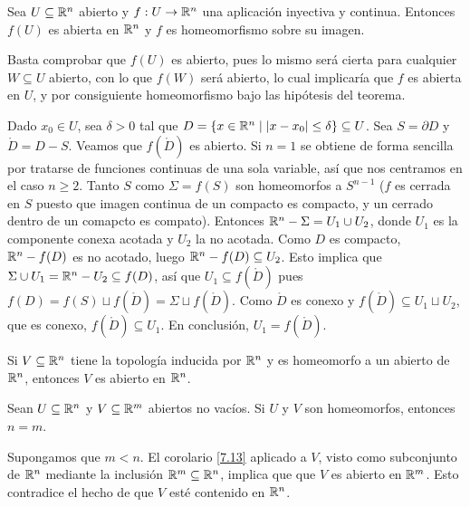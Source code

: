 \documentclass[CV.tex]{subfiles}
\begin{document}
\begin{teorema}[de Brouwer] 
Sea $U\subseteq\mathbb{R}^n$ abierto y $f:U\to\mathbb{R}^n$ una aplicación inyectiva y continua. Entonces $f(U)$ es abierta en $\mathbb{R}^n$ y $f$ es homeomorfismo sobre su imagen. 
\end{teorema}
\begin{dem}
Basta comprobar que $f(U)$ es abierto, pues lo mismo será cierta para cualquier $W\subseteq U$ abierto, con lo que $f(W)$ será abierto, lo cual implicaría que $f$ es abierta en $U$, y por consiguiente homeomorfismo bajo las hipótesis del teorema. 

Dado $x_0\in U$, sea $\delta>0$ tal que $D=\{x\in\mathbb{R}^n\mid |x-x_0|\leq\delta\}\subseteq U$. Sea $S=\partial D$ y $\mathring{D}=D-S$. Veamos que $f(\mathring{D})$ es abierto. Si $n=1$ se obtiene de forma sencilla por tratarse de funciones continuas de una sola variable, así que nos centramos en el caso $n\geq 2$. Tanto $S$ como $\Sigma=f(S)$ son homeomorfos a $S^{n-1}$ ($f$ es cerrada en $S$ puesto que imagen continua de un compacto es compacto, y un cerrado dentro de un comapcto es compato). Entonces $\mathbb{R}^n-\Sigma=U_1\cup U_2$, donde $U_1$ es la componente conexa acotada y $U_2$ la no acotada. Como $D$ es compacto, $\mathbb{R}^n-f(D)$ es no acotado, luego $\mathbb{R}^n-f(D)\subseteq U_2$. Esto implica que $\Sigma\cup U_1=\mathbb{R}^n-U_2\subseteq f(D)$, así que $U_1\subseteq f(\mathring{D})$ pues $f(D)=f(S)\sqcup f(\mathring{D})=\Sigma\sqcup f(\mathring{D})$. Como $\mathring{D}$ es conexo y $f(\mathring{D})\subseteq U_1\sqcup U_2$, que es conexo, $f(\mathring{D})\subseteq U_1$. En conclusión, $U_1=f(\mathring{D})$. \QED
\end{dem}

\begin{coro}\label{7.13}
Si $V\subseteq\mathbb{R}^n$ tiene la topología inducida por $\mathbb{R}^n$ y es homeomorfo a un abierto de $\mathbb{R}^n$, entonces $V$ es abierto en $\mathbb{R}^n$.
\end{coro}


\begin{coro}
Sean $U\subseteq\mathbb{R}^n$ y $V\subseteq\mathbb{R}^m$ abiertos no vacíos. Si $U$ y $V$ son homeomorfos, entonces $n=m$.
\end{coro}
\begin{dem}
Supongamos que $m<n$. El corolario \ref{7.13} aplicado a $V$, visto como subconjunto de $\mathbb{R}^n$ mediante la inclusión $\mathbb{R}^m\subseteq\mathbb{R}^n$, implica que que $V$ es abierto en $\mathbb{R}^m$. Esto contradice el hecho de que $V$ esté contenido en $\mathbb{R}^n$. \QED
\end{dem}
\end{document}
